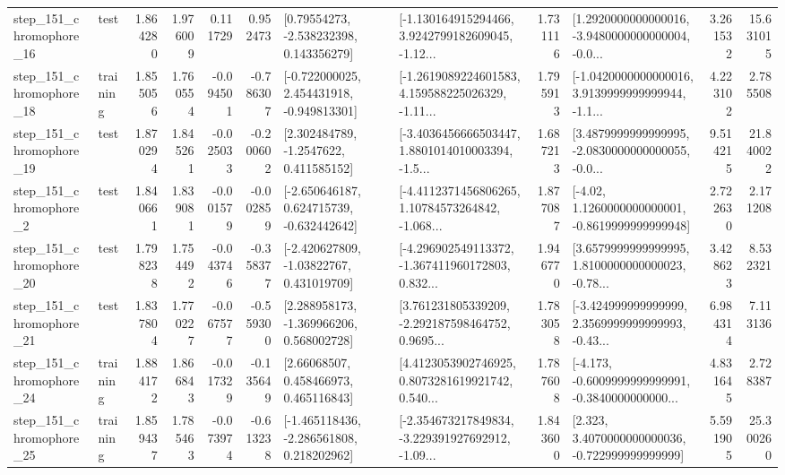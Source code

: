 \begin{tabular}{llrrrrllrlrr}
  step\_151\_chromophore\_16 &      test &      1.864280 &    1.976009 &      0.111729 &  0.952473 &     [0.79554273, -2.538232398, 0.143356279] &  [-1.130164915294466, 3.9242799182609045, -1.12... &       1.731116 &  [1.2920000000000016, -3.9480000000000004, -0.0... &            3.261532 &         15.631015 \\
  step\_151\_chromophore\_18 &  training &      1.855056 &    1.760554 &     -0.094501 & -0.786307 &   [-0.722000025, 2.454431918, -0.949813301] &  [-1.2619089224601583, 4.159588225026329, -1.11... &       1.795913 &  [-1.0420000000000016, 3.9139999999999944, -1.1... &            4.223102 &          2.785508 \\
  step\_151\_chromophore\_19 &      test &      1.870294 &    1.845261 &     -0.025033 & -0.200602 &      [2.302484789, -1.2547622, 0.411585152] &  [-3.4036456666503447, 1.8801014010003394, -1.5... &       1.687213 &  [3.4879999999999995, -2.0830000000000055, -0.0... &            9.514215 &         21.840022 \\
   step\_151\_chromophore\_2 &      test &      1.840661 &    1.839081 &     -0.001579 & -0.002859 &   [-2.650646187, 0.624715739, -0.632442642] &  [-4.4112371456806265, 1.10784573264842, -1.068... &       1.877087 &   [-4.02, 1.1260000000000001, -0.8619999999999948] &            2.722630 &          2.171208 \\
  step\_151\_chromophore\_20 &      test &      1.798238 &    1.754492 &     -0.043746 & -0.358377 &    [-2.420627809, -1.03822767, 0.431019709] &  [-4.296902549113372, -1.367411960172803, 0.832... &       1.946770 &  [3.6579999999999995, 1.8100000000000023, -0.78... &            3.428623 &          8.532321 \\
  step\_151\_chromophore\_21 &      test &      1.837804 &    1.770227 &     -0.067577 & -0.559300 &    [2.288958173, -1.369966206, 0.568002728] &  [3.761231805339209, -2.292187598464752, 0.9695... &       1.783058 &  [-3.424999999999999, 2.3569999999999993, -0.43... &            6.984314 &          7.113136 \\
  step\_151\_chromophore\_24 &  training &      1.884172 &    1.866843 &     -0.017329 & -0.135649 &      [2.66068507, 0.458466973, 0.465116843] &  [4.4123053902746925, 0.8073281619921742, 0.540... &       1.787608 &  [-4.173, -0.6009999999999991, -0.3840000000000... &            4.831645 &          2.728387 \\
  step\_151\_chromophore\_25 &  training &      1.859437 &    1.785463 &     -0.073974 & -0.613238 &   [-1.465118436, -2.286561808, 0.218202962] &  [-2.354673217849834, -3.229391927692912, -1.09... &       1.843600 &    [2.323, 3.4070000000000036, -0.722999999999999] &            5.591905 &         25.300260 \\

\end{tabular}
